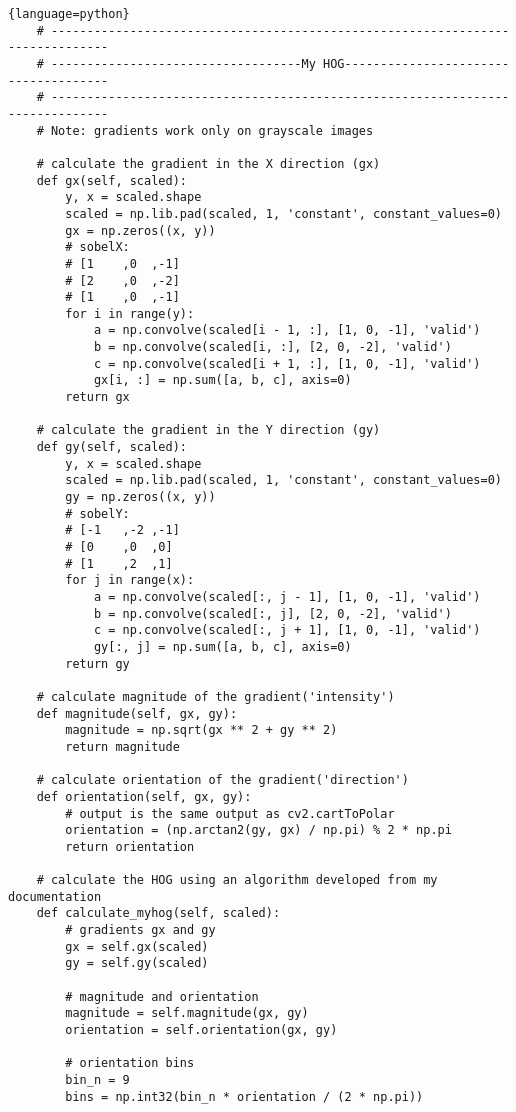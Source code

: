 \begin{lstlisting}{language=python}
    # ------------------------------------------------------------------------------
    # -----------------------------------My HOG-------------------------------------
    # ------------------------------------------------------------------------------
    # Note: gradients work only on grayscale images

    # calculate the gradient in the X direction (gx)
    def gx(self, scaled):
        y, x = scaled.shape
        scaled = np.lib.pad(scaled, 1, 'constant', constant_values=0)
        gx = np.zeros((x, y))
        # sobelX:
        # [1	,0	,-1]
        # [2	,0	,-2]
        # [1	,0	,-1]
        for i in range(y):
            a = np.convolve(scaled[i - 1, :], [1, 0, -1], 'valid')
            b = np.convolve(scaled[i, :], [2, 0, -2], 'valid')
            c = np.convolve(scaled[i + 1, :], [1, 0, -1], 'valid')
            gx[i, :] = np.sum([a, b, c], axis=0)
        return gx
		
    # calculate the gradient in the Y direction (gy)
    def gy(self, scaled):
        y, x = scaled.shape
        scaled = np.lib.pad(scaled, 1, 'constant', constant_values=0)
        gy = np.zeros((x, y))
        # sobelY:
        # [-1	,-2	,-1]
        # [0	,0	,0]
        # [1	,2	,1]
        for j in range(x):
            a = np.convolve(scaled[:, j - 1], [1, 0, -1], 'valid')
            b = np.convolve(scaled[:, j], [2, 0, -2], 'valid')
            c = np.convolve(scaled[:, j + 1], [1, 0, -1], 'valid')
            gy[:, j] = np.sum([a, b, c], axis=0)
        return gy

    # calculate magnitude of the gradient('intensity')
    def magnitude(self, gx, gy):
        magnitude = np.sqrt(gx ** 2 + gy ** 2)
        return magnitude

    # calculate orientation of the gradient('direction')
    def orientation(self, gx, gy):
        # output is the same output as cv2.cartToPolar
        orientation = (np.arctan2(gy, gx) / np.pi) % 2 * np.pi  
        return orientation
	
    # calculate the HOG using an algorithm developed from my documentation
    def calculate_myhog(self, scaled):
        # gradients gx and gy
        gx = self.gx(scaled)
        gy = self.gy(scaled)

        # magnitude and orientation
        magnitude = self.magnitude(gx, gy)
        orientation = self.orientation(gx, gy)

        # orientation bins
        bin_n = 9
        bins = np.int32(bin_n * orientation / (2 * np.pi))


\end{lstlisting}
